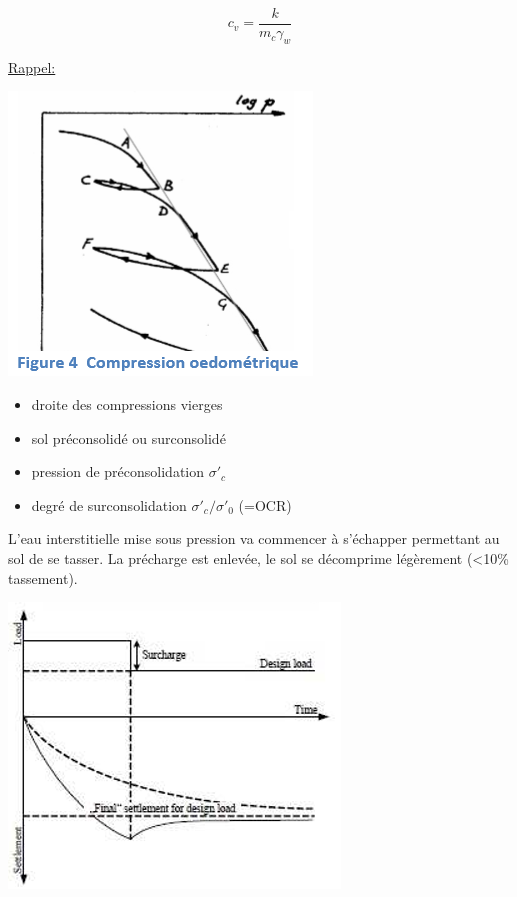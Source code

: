 $$  c_v = \frac{k}{m_c \gamma_w} $$

\underline{Rappel:} 

\begin{center}
\includegraphics [scale=0.5]{pictures/oe.PNG}
\end{center}

\begin{itemize}
    \item droite des compressions vierges
    \item sol préconsolidé ou surconsolidé
    \item pression de préconsolidation $\sigma'_c$
    \item degré de surconsolidation $\sigma'_c / \sigma'_0$ (=OCR)
\end{itemize} 

\medskip

L'eau interstitielle mise sous pression va commencer à s'échapper permettant au sol de se tasser. La précharge est enlevée, le sol se décomprime légèrement (<10\% tassement).

\begin{center}
\includegraphics [scale=0.5]{pictures/a.PNG}
\end{center}

